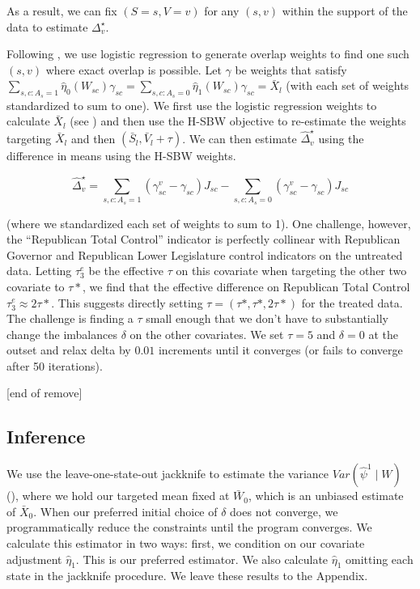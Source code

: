 \documentclass[aoas]{imsart}
\theoremstyle{plain}
\theoremstyle{remark}
\begin{document}
As a result, we can fix $(S = s, V = v)$ for any $(s, v)$ within the support of the data to estimate $\Delta^\star_v$. 

Following \cite{li2018balancing}, we use logistic regression to generate overlap weights to find one such $(s, v)$ where exact overlap is possible. Let $\gamma$ be weights that satisfy $\sum_{s,c: A_s = 1} \hat{\eta}_0(W_{sc})\gamma_{sc} = \sum_{s, c: A_s = 0} \hat{\eta}_1(W_{sc})\gamma_{sc} = \bar{X}_l$ (with each set of weights standardized to sum to one). We first use the logistic regression weights to calculate $\bar{X}_l$ (see \cite{li2018balancing}) and then use the H-SBW objective to re-estimate the weights targeting $\bar{X}_l$ and then $(\bar{S}_l, \bar{V}_l + \tau)$. We can then estimate $\hat{\Delta}^\star_v$ using the difference in means using the H-SBW weights.

$$
\hat{\Delta}^\star_v = \sum_{s,c: A_s = 1}(\gamma_{sc}^v - \gamma_{sc})J_{sc} - \sum_{s,c: A_s = 0}(\gamma_{sc}^v - \gamma_{sc})J_{sc}
$$

(where we standardized each set of weights to sum to 1). One challenge, however, the ``Republican Total Control'' indicator is perfectly collinear with Republican Governor and Republican Lower Legislature control indicators on the untreated data. Letting $\tau^e_3$ be the effective $\tau$ on this covariate when targeting the other two covariate to $\tau*$, we find that the effective difference on Republican Total Control $\tau^e_3 \approx 2\tau*$. This suggests directly setting $\tau = (\tau*, \tau*, 2\tau*)$ for the treated data. The challenge is finding a $\tau$ small enough that we don't have to substantially change the imbalances $\delta$ on the other covariates. We set $\tau = 5$ and $\delta = 0$ at the outset and relax delta by $0.01$ increments until it converges (or fails to converge after 50 iterations).

[end of remove]

\subsection{Inference}

We use the leave-one-state-out jackknife to estimate the variance $Var(\hat{\psi}^1 \mid W)$ (\cite{cameron2015practitioner}), where we hold our targeted mean fixed at $\bar{W}_0$, which is an unbiased estimate of $\bar{X}_0$. When our preferred initial choice of $\delta$ does not converge, we programmatically reduce the constraints until the program converges. We calculate this estimator in two ways: first, we condition on our covariate adjustment $\hat{\eta}_1$. This is our preferred estimator. We also calculate $\hat{\eta}_1$ omitting each state in the jackknife procedure. We leave these results to the Appendix.
\end{document}
